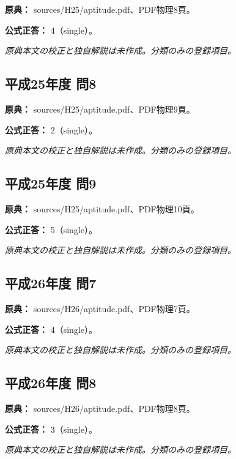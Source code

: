 \noindent\textbf{原典：} sources/H25/aptitude.pdf、PDF物理8頁。

\textbf{公式正答：} 4（single）。

\par\textit{原典本文の校正と独自解説は未作成。分類のみの登録項目。}

\subsection{平成25年度 問8}
\label{q:h25-reg-apt-08}

\noindent\textbf{原典：} sources/H25/aptitude.pdf、PDF物理9頁。

\textbf{公式正答：} 2（single）。

\par\textit{原典本文の校正と独自解説は未作成。分類のみの登録項目。}

\subsection{平成25年度 問9}
\label{q:h25-reg-apt-09}

\noindent\textbf{原典：} sources/H25/aptitude.pdf、PDF物理10頁。

\textbf{公式正答：} 5（single）。

\par\textit{原典本文の校正と独自解説は未作成。分類のみの登録項目。}

\subsection{平成26年度 問7}
\label{q:h26-reg-apt-07}

\noindent\textbf{原典：} sources/H26/aptitude.pdf、PDF物理7頁。

\textbf{公式正答：} 4（single）。

\par\textit{原典本文の校正と独自解説は未作成。分類のみの登録項目。}

\subsection{平成26年度 問8}
\label{q:h26-reg-apt-08}

\noindent\textbf{原典：} sources/H26/aptitude.pdf、PDF物理8頁。

\textbf{公式正答：} 3（single）。

\par\textit{原典本文の校正と独自解説は未作成。分類のみの登録項目。}

